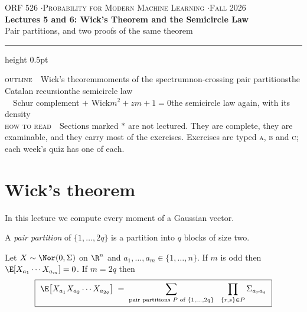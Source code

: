 \documentclass[11pt]{article}
\begin{document}
\begin{center}
{\footnotesize\color{acc}\textsc{ORF 526 \quad$\cdot$\quad Probability for Modern Machine Learning \quad$\cdot$\quad Fall 2026}}\\[0.5em]
{\LARGE\bfseries Lectures 5 and 6: Wick's Theorem and the Semicircle Law}\\[0.35em]
{\color{grey} Pair partitions, and two proofs of the same theorem}
\end{center}
\vspace{0.4em}
\hrule height 0.5pt
\vspace{0.6em}

\begin{roadmap}
{\color{acc}\textsc{outline}}\ \ Wick's theorem\rmto moments of the spectrum\rmto non-crossing pair partitions\rmto the Catalan recursion\rmto the semicircle law\\[0.35em]
\ \ Schur complement $+$ Wick\rmto $m^2+zm+1=0$\rmto the semicircle law again, with its density\\[0.35em]
{\color{acc}\textsc{how to read}}\ \ Sections marked \textcolor{acc}{$\ast$} are not lectured. They are complete, they are examinable, and they carry most of the exercises. Exercises are typed \textsc{a}, \textsc{b} and \textsc{c}; each week's quiz has one of each.
\end{roadmap}

\section{Wick's theorem}

In this lecture we compute every moment of a Gaussian vector.

\begin{definition}\label{def:pp}
A \emph{pair partition} of $\{1,\dots,2q\}$ is a partition into $q$ blocks of size two.
\end{definition}

\begin{theorem}[Wick]\label{thm:wick}
Let $X\sim\Nor(0,\Sigma)$ on $\R^n$ and $a_1,\dots,a_m\in\{1,\dots,n\}$. If $m$ is odd then $\E[X_{a_1}\cdots X_{a_m}]=0$. If $m=2q$ then
\[
\boxed{\ \E\big[X_{a_1}X_{a_2}\cdots X_{a_{2q}}\big]\;=\;\sum_{\text{pair partitions }P\text{ of }\{1,\dots,2q\}}\ \ \prod_{\{r,s\}\in P}\Sigma_{a_ra_s}\ }
\]
\end{theorem}
\end{document}
